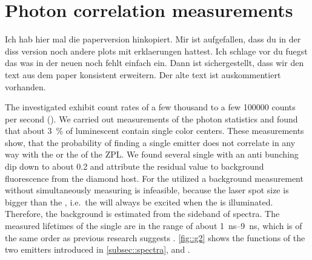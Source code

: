 	\section{Photon correlation measurements} \label{subsec::g2}

		\begin{remark}

			Ich hab hier mal die paperversion hinkopiert. Mir ist aufgefallen, dass du in der diss version noch andere plots mit erklaerungen hattest. Ich schlage vor du fuegst das was in der neuen noch fehlt einfach ein. Dann ist sichergestellt, dass wir den text aus dem paper konsistent erweitern. Der alte text ist auskommentiert vorhanden.

		\end{remark}

		The investigated \sivs exhibit count rates of a few thousand to a few \num{100000} counts per second (\SI{}{\cps}).
		We carried out measurements of the photon statistics and found that about \SI{3}{\percent} of luminescent \nds contain single color centers.
		These measurements show, that the probability of finding a single emitter does not correlate in any way with the \cwl or the \lw of the ZPL.
		We found several single \sivs with an anti bunching dip down to about \num{0.2} and attribute the residual \gtz value to background fluorescence from the diamond host.
		For the utilized \nds a background measurement without simultaneously measuring \siv \pl is infeasible, because the laser spot size is bigger than the \nd, i.e.\ the \siv will always be excited when the \nd is illuminated.
		Therefore, the background is estimated from the sideband of \siv spectra.
		The measured lifetimes of the single \sivs are in the range of about \SIrange{1}{9}{\ns}, which is of the same order as previous research suggests \cite{Sipahigil2014,Sternschulte1994}.
		\cref{fig::g2} shows the \gt functions of the two emitters introduced in \cref{subsec::spectra}, \emnarrow and \embroad.

